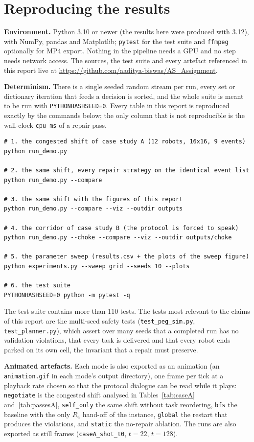 \documentclass[10pt,a4paper]{article}
\newcommand{\code}[1]{\texttt{#1}}
\begin{document}
\section{Reproducing the results}\label{sec:run}

\textbf{Environment.}  Python 3.10 or newer (the results here were produced
with 3.12), with NumPy, pandas and Matplotlib; \code{pytest} for the test
suite and \code{ffmpeg} optionally for MP4 export.  Nothing in the pipeline
needs a GPU and no step needs network access.  The sources, the test suite and
every artefact referenced in this report live at
\url{https://github.com/aaditya-biswas/AS_Assignment}.

\textbf{Determinism.}  There is a single seeded random stream per run, every
set or dictionary iteration that feeds a decision is sorted, and the whole
suite is meant to be run with \code{PYTHONHASHSEED=0}.  Every table in this
report is reproduced exactly by the commands below; the only column that is
not reproducible is the wall-clock \code{cpu\_ms} of a repair pass.

\begin{lstlisting}[style=shell]
# 1. the congested shift of case study A (12 robots, 16x16, 9 events)
python run_demo.py

# 2. the same shift, every repair strategy on the identical event list
python run_demo.py --compare

# 3. the same shift with the figures of this report
python run_demo.py --compare --viz --outdir outputs

# 4. the corridor of case study B (the protocol is forced to speak)
python run_demo.py --choke --compare --viz --outdir outputs/choke

# 5. the parameter sweep (results.csv + the plots of the sweep figure)
python experiments.py --sweep grid --seeds 10 --plots

# 6. the test suite
PYTHONHASHSEED=0 python -m pytest -q
\end{lstlisting}

The test suite contains more than 110 tests.  The tests most relevant to the
claims of this report are the multi-seed safety tests
(\code{test\_peg\_sim.py}, \code{test\_planner.py}), which assert over many
seeds that a completed run has no validation violations, that every task is
delivered and that every robot ends parked on its own cell, the invariant
that a repair must preserve.

\textbf{Animated artefacts.}  Each mode is also exported as an animation
(an \code{animation.gif} in each mode's output directory), one frame per tick
at a playback rate chosen so that the protocol dialogue can be read while it
plays:
\code{negotiate} is the congested shift analysed in Tables~\ref{tab:caseA}
and~\ref{tab:passesA}, \code{self\_only} the same shift without task
reordering, \code{bfs} the baseline with the only $R_4$ hand-off of the
instance, \code{global} the restart that produces the violations, and
\code{static} the no-repair ablation.  The runs are also exported as still
frames (\code{caseA\_shot\_t0}, $t=22$, $t=128$).
\end{document}
